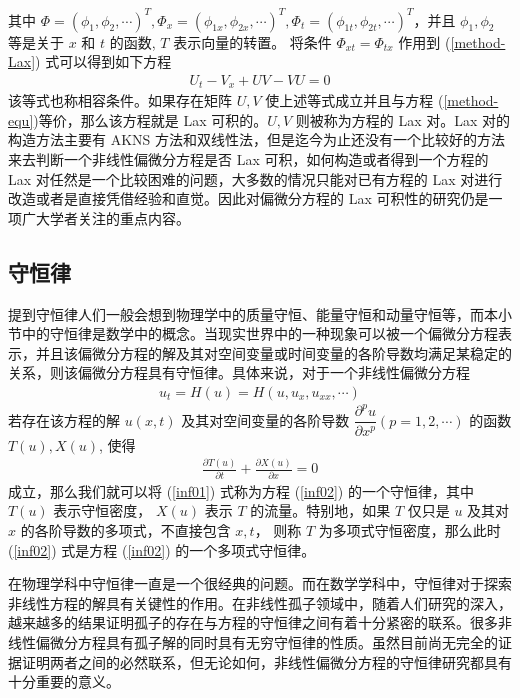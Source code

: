 其中 $\Phi=(\phi_1, \phi_2, \cdots)^T, \Phi_x=(\phi_{1x}, \phi_{2x}, \cdots)^T, \Phi_t=(\phi_{1t}, \phi_{2t}, \cdots)^T$，并且 $\phi_1, \phi_2$ 等是关于 $x$ 和 $t$ 的函数, $T$ 表示向量的转置。 将条件 $\Phi_{xt}=\Phi_{tx}$ 作用到 (\ref{method-Lax}) 式可以得到如下方程
\begin{align}
U_t-V_x+UV-VU=0
\end{align}
该等式也称相容条件。如果存在矩阵 $U, V$ 使上述等式成立并且与方程 (\ref{method-equ})等价，那么该方程就是  Lax 可积的。$U, V$ 则被称为方程的 Lax 对。Lax 对的构造方法主要有  AKNS 方法和双线性法，但是迄今为止还没有一个比较好的方法来去判断一个非线性偏微分方程是否 Lax 可积，如何构造或者得到一个方程的 Lax 对任然是一个比较困难的问题，大多数的情况只能对已有方程的 Lax 对进行改造或者是直接凭借经验和直觉。因此对偏微分方程的 Lax 可积性的研究仍是一项广大学者关注的重点内容。

\subsection{守恒律}
提到守恒律人们一般会想到物理学中的质量守恒、能量守恒和动量守恒等，而本小节中的守恒律是数学中的概念。当现实世界中的一种现象可以被一个偏微分方程表示，并且该偏微分方程的解及其对空间变量或时间变量的各阶导数均满足某稳定的关系，则该偏微分方程具有守恒律。具体来说，对于一个非线性偏微分方程
\begin{align}
u_t = H(u) =  H(u, u_x, u_{xx}, \cdots)\label{inf02}
\end{align}
若存在该方程的解  $u(x, t)$ 及其对空间变量的各阶导数 $\dfrac{\partial^pu}{\partial x^p}(p=1,2,\cdots)$ 的函数 $T(u), X(u)$, 使得
\begin{align}
\frac{\partial T(u)}{\partial t}+\frac{\partial X(u)}{\partial x}=0 \label{inf01}
\end{align}
成立，那么我们就可以将 (\ref{inf01}) 式称为方程 (\ref{inf02}) 的一个守恒律，其中 $T(u)$ 表示守恒密度， $X(u)$ 表示 $T$ 的流量。特别地，如果 $T$ 仅只是 $u$ 及其对 $x$ 的各阶导数的多项式，不直接包含 $x, t$， 则称 $T$ 为多项式守恒密度，那么此时 (\ref{inf02}) 式是方程 (\ref{inf02}) 的一个多项式守恒律。

在物理学科中守恒律一直是一个很经典的问题。而在数学学科中，守恒律对于探索非线性方程的解具有关键性的作用。在非线性孤子领域中，随着人们研究的深入，越来越多的结果证明孤子的存在与方程的守恒律之间有着十分紧密的联系。很多非线性偏微分方程具有孤子解的同时具有无穷守恒律的性质。虽然目前尚无完全的证据证明两者之间的必然联系，但无论如何，非线性偏微分方程的守恒律研究都具有十分重要的意义。


